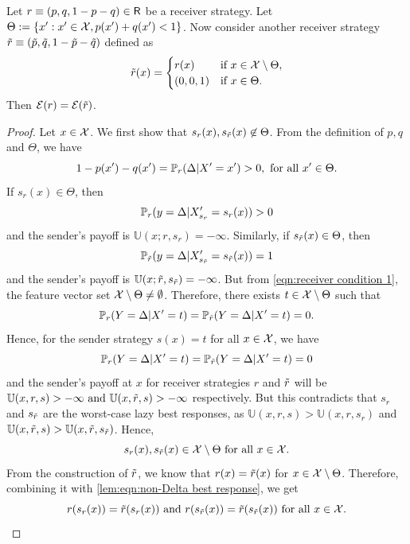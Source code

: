 \begin{lem}\label{lem:delta null wlog}
    Let $r \equiv (p,q,1-p-q) \in \mathsf{R}$ be a receiver strategy. Let $\Theta := \{x': x' \in \mathcal{X}, p(x') + q(x') <1\}$. Now consider another receiver strategy $\tilde{r} \equiv (\tilde{p},\tilde{q},1-\tilde{p} - \tilde{q})$ defined as
    \[
    \tilde{r}(x) = \begin{cases}
        r(x) &\text{if } x \in \mathcal{X}\setminus \Theta,\\
        (0,0,1) &\text{if } x \in \Theta.
    \end{cases}
    \]
    Then $\mathcal{E}(r) = \mathcal{E}(\tilde{r})$.
\end{lem}

\begin{proof}\label{proof:delta null wlog}
Let $x \in \mathcal{X}$. We first show that $s_r(x),s_{\tilde{r}}(x) \not\in \Theta$. From the definition of $p,q$ and $\Theta$, we have
    \[1-p(x')-q(x') =\mathbb{P}_r(\Delta|X' = x')  > 0, \text{ for all } x' \in \Theta.\]
    \noindent If $s_r(x) \in \Theta$, then $$\mathbb{P}_r(y = \Delta|X'_{s_r}=s_r(x)) > 0$$ and the sender's payoff is $\mathbb{U}(x;r,s_r) = -\infty$.
    Similarly, if $s_{\tilde{r}}(x) \in \Theta$, then \[\mathbb{P}_{\tilde{r}}(y = \Delta|X'_{s_{\tilde{r}}} = s_{\tilde{r}}(x)) = 1 \] and the sender's payoff is $\mathbb{U}(x;\tilde{r},s_{\tilde{r}}) = -\infty$.
    But from \eqref{eqn:receiver condition 1}, the feature vector set $\mathcal{X}\setminus \Theta \neq \emptyset$. Therefore, there exists $t \in \mathcal{X}\setminus \Theta$ such that
        $$\mathbb{P}_r(Y = \Delta|X'=t) = \mathbb{P}_{\tilde{r}}(Y = \Delta|X'=t) = 0.$$
Hence, for the sender strategy $s(x) = t$ for all $x \in \mathcal{X}$, we have
    $$\mathbb{P}_r(Y=\Delta|X'=t) = \mathbb{P}_{\tilde{r}}(Y=\Delta|X'=t) = 0$$ and
    the sender's payoff at $x$ for receiver strategies $r$ and $\tilde{r}$ will be $\mathbb{U}(x,r,s) > -\infty\text{ and } \mathbb{U}(x,\tilde{r},s) > -\infty$ respectively.
    But this contradicts that $s_r$ and $s_{\tilde{r}}$ are the worst-case lazy best responses, as $\mathbb{U}(x,r,s) > \mathbb{U}(x,r,s_r)$ and $\mathbb{U}(x,\tilde{r},s) > \mathbb{U}(x,\tilde{r},s_{\tilde{r}})$. Hence,
    \begin{equation}\label{lem:eqn:non-Delta best response}
        s_r(x), s_{\tilde{r}}(x) \in \mathcal{X} \setminus \Theta \text{ for all } x \in \mathcal{X}.
    \end{equation}
    From the construction of $\tilde{r}$, we know that $r(x) = \tilde{r}(x)$ for $x \in \mathcal{X} \setminus \Theta$. Therefore, combining it with \eqref{lem:eqn:non-Delta best response}, we get
    \begin{equation}\label{eqn:lem:non-Delta best response 2}
        r(s_r(x)) = \rt(s_r(x)) \text{ and } r(s_{\rt}(x)) = \rt(s_{\rt}(x)) \text{ for all } x \in \cg{X}.

\end{equation}
\end{proof}
